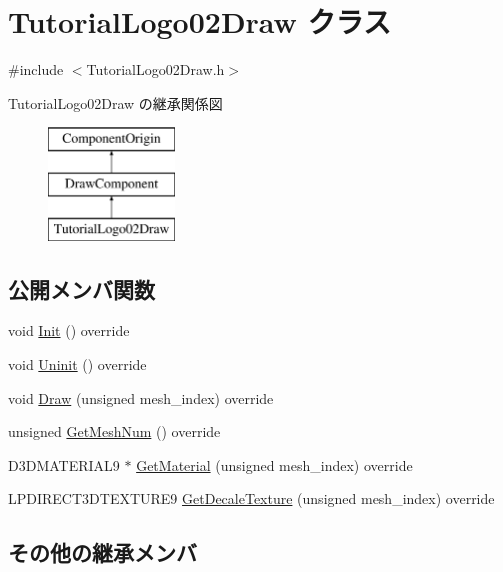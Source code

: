 \hypertarget{class_tutorial_logo02_draw}{}\section{Tutorial\+Logo02\+Draw クラス}
\label{class_tutorial_logo02_draw}


{\ttfamily \#include $<$Tutorial\+Logo02\+Draw.\+h$>$}

Tutorial\+Logo02\+Draw の継承関係図\begin{figure}[H]
\begin{center}
\leavevmode
\includegraphics[height=3.000000cm]{class_tutorial_logo02_draw}
\end{center}
\end{figure}
\subsection*{公開メンバ関数}
\begin{DoxyCompactItemize}
\item 
void \mbox{\hyperlink{class_tutorial_logo02_draw_abc431ab08655c42960659da325d34f13}{Init}} () override
\item 
void \mbox{\hyperlink{class_tutorial_logo02_draw_a9eec09783781876d354c51d4f2acf2cd}{Uninit}} () override
\item 
void \mbox{\hyperlink{class_tutorial_logo02_draw_a616cd2a60e7bc628bfa7845f4cefaa0a}{Draw}} (unsigned mesh\+\_\+index) override
\item 
unsigned \mbox{\hyperlink{class_tutorial_logo02_draw_aadb36d767f9cca619453885dacdff836}{Get\+Mesh\+Num}} () override
\item 
D3\+D\+M\+A\+T\+E\+R\+I\+A\+L9 $\ast$ \mbox{\hyperlink{class_tutorial_logo02_draw_a9127cd4fd59a7e03236df177296c849c}{Get\+Material}} (unsigned mesh\+\_\+index) override
\item 
L\+P\+D\+I\+R\+E\+C\+T3\+D\+T\+E\+X\+T\+U\+R\+E9 \mbox{\hyperlink{class_tutorial_logo02_draw_a38a329b442624c0afdf08d91c7932295}{Get\+Decale\+Texture}} (unsigned mesh\+\_\+index) override
\end{DoxyCompactItemize}
\subsection*{その他の継承メンバ}



